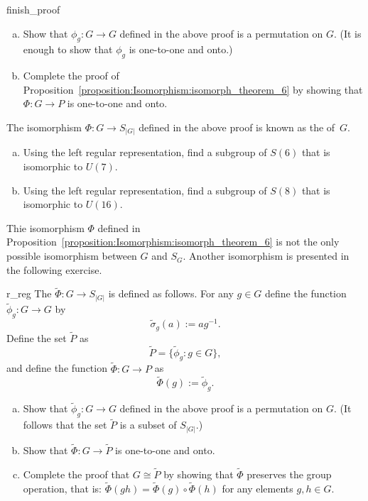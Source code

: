 \begin{exercise}{finish_proof}
\begin{enumerate}[(a)]
\item
Show that $\phi_g : G \rightarrow G$ defined in the above proof is a permutation on $G$. (It is enough to show that $\phi_g$ is one-to-one and onto.) 
\item
Complete the proof of Proposition~\ref{proposition:Isomorphism:isomorph_theorem_6} by showing that $\Phi:G \rightarrow P$ is one-to-one and onto. 
\end{enumerate}
\end{exercise}

The isomorphism $\Phi: G \rightarrow S_{|G|}$ defined in the above proof is known as the  of~$G$. 

\begin{exercise}{}
\begin{enumerate}[(a)]
\item
Using the left regular representation, find a subgroup of $S(6)$ that is isomorphic to $U(7)$.
\item
Using the left regular representation, find a subgroup of $S(8)$ that is isomorphic to $U(16)$.
\end{enumerate}
\end{exercise}

Thie isomorphism $\Phi$ defined in Proposition~\ref{proposition:Isomorphism:isomorph_theorem_6}  is not the only possible isomorphism between $G$ and $S_{G}$. Another isomorphism is presented in the following exercise.

\begin{exercise}{r_reg}
The   $\tilde{\Phi}: G \rightarrow S_{|G|}$  is defined as follows. For any $g \in G$ define the  function $\tilde{\phi}_g : G \rightarrow G$ by 
\[
\tilde{\sigma}_g(a) := ag^{-1}.
\]
Define the set $\tilde{P}$ as
\[
\tilde{P} = \{ \tilde{\phi}_g : g \in G \},
\]
and define the function $\tilde{\Phi}: G \rightarrow P$ as
\[ \tilde{\Phi}(g) := \tilde{\phi}_g. \]
\begin{enumerate}[(a)]
\item
Show that $\tilde{\phi}_g : G \rightarrow G$ defined in the above proof is a permutation on $G$. (It follows that the set $\tilde{P}$ is a subset of $S_{|G|}$.)
\item
Show that $\tilde{\Phi}:G \rightarrow \tilde{P}$ is one-to-one and onto. 
 \item
Complete the proof that $G \cong \tilde{P}$ by showing that $\tilde{\Phi}$ preserves the group operation, that is: $\tilde{\Phi}(gh) = \tilde{\Phi}(g) \circ \tilde{\Phi}(h)$ for any elements $g, h \in G$.
\end{enumerate}
\end{exercise}

